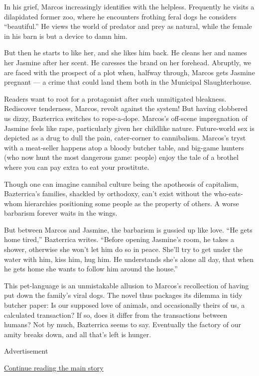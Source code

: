 In his grief, Marcos increasingly identifies with the helpless.
Frequently he visits a dilapidated former zoo, where he encounters
frothing feral dogs he considers ``beautiful.'' He views the world of
predator and prey as natural, while the female in his barn is but a
device to damn him.

But then he starts to like her, and she likes him back. He cleans her
and names her Jasmine after her scent. He caresses the brand on her
forehead. Abruptly, we are faced with the prospect of a plot when,
halfway through, Marcos gets Jasmine pregnant --- a crime that could
land them both in the Municipal Slaughterhouse.

Readers want to root for a protagonist after such unmitigated bleakness.
Rediscover tenderness, Marcos, revolt against the system! But having
clobbered us dizzy, Bazterrica switches to rope-a-dope. Marcos's
off-scene impregnation of Jasmine feels like rape, particularly given
her childlike nature. Future-world sex is depicted as a drug to dull the
pain, cater-corner to cannibalism. Marcos's tryst with a meat-seller
happens atop a bloody butcher table, and big-game hunters (who now hunt
the most dangerous game: people) enjoy the tale of a brothel where you
can pay extra to eat your prostitute.

Though one can imagine cannibal culture being the apotheosis of
capitalism, Bazterrica's families, shackled by orthodoxy, can't exist
without the who-eats-whom hierarchies positioning some people as the
property of others. A worse barbarism forever waits in the wings.

But between Marcos and Jasmine, the barbarism is gussied up like love.
``He gets home tired,'' Bazterrica writes. ``Before opening Jasmine's
room, he takes a shower, otherwise she won't let him do so in peace.
She'll try to get under the water with him, kiss him, hug him. He
understands she's alone all day, that when he gets home she wants to
follow him around the house.''

This pet-language is an unmistakable allusion to Marcos's recollection
of having put down the family's viral dogs. The novel thus packages its
dilemma in tidy butcher paper: Is our supposed love of animals, and
occasionally theirs of us, a calculated transaction? If so, does it
differ from the transactions between humans? Not by much, Bazterrica
seems to say. Eventually the factory of our amity breaks down, and all
that's left is hunger.

Advertisement

\protect\hyperlink{after-bottom}{Continue reading the main story}

